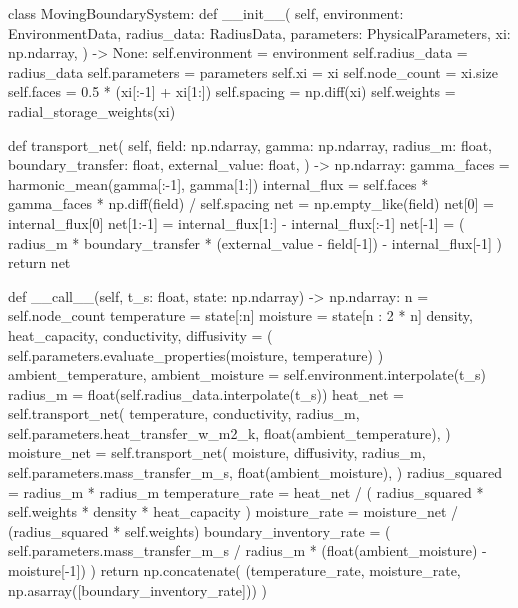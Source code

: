 \documentclass[withoutpreface,bwprint]{cumcmthesis}
\begin{document}
\begin{PythonCode}
class MovingBoundarySystem:
    def __init__(
        self,
        environment: EnvironmentData,
        radius_data: RadiusData,
        parameters: PhysicalParameters,
        xi: np.ndarray,
    ) -> None:
        self.environment = environment
        self.radius_data = radius_data
        self.parameters = parameters
        self.xi = xi
        self.node_count = xi.size
        self.faces = 0.5 * (xi[:-1] + xi[1:])
        self.spacing = np.diff(xi)
        self.weights = radial_storage_weights(xi)

    def transport_net(
        self,
        field: np.ndarray,
        gamma: np.ndarray,
        radius_m: float,
        boundary_transfer: float,
        external_value: float,
    ) -> np.ndarray:
        gamma_faces = harmonic_mean(gamma[:-1], gamma[1:])
        internal_flux = self.faces * gamma_faces * np.diff(field) / self.spacing
        net = np.empty_like(field)
        net[0] = internal_flux[0]
        net[1:-1] = internal_flux[1:] - internal_flux[:-1]
        net[-1] = (
            radius_m * boundary_transfer * (external_value - field[-1])
            - internal_flux[-1]
        )
        return net

    def __call__(self, t_s: float, state: np.ndarray) -> np.ndarray:
        n = self.node_count
        temperature = state[:n]
        moisture = state[n : 2 * n]
        density, heat_capacity, conductivity, diffusivity = (
            self.parameters.evaluate_properties(moisture, temperature)
        )
        ambient_temperature, ambient_moisture = self.environment.interpolate(t_s)
        radius_m = float(self.radius_data.interpolate(t_s))
        heat_net = self.transport_net(
            temperature,
            conductivity,
            radius_m,
            self.parameters.heat_transfer_w_m2_k,
            float(ambient_temperature),
        )
        moisture_net = self.transport_net(
            moisture,
            diffusivity,
            radius_m,
            self.parameters.mass_transfer_m_s,
            float(ambient_moisture),
        )
        radius_squared = radius_m * radius_m
        temperature_rate = heat_net / (
            radius_squared * self.weights * density * heat_capacity
        )
        moisture_rate = moisture_net / (radius_squared * self.weights)
        boundary_inventory_rate = (
            self.parameters.mass_transfer_m_s
            / radius_m
            * (float(ambient_moisture) - moisture[-1])
        )
        return np.concatenate(
            (temperature_rate, moisture_rate, np.asarray([boundary_inventory_rate]))
        )



\end{PythonCode}
\end{document}
